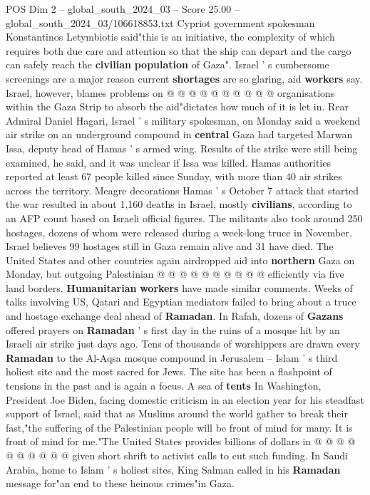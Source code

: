 \begin{textsample}{POS Dim 2 – global\_south\_2024\_03 – Score 25.00 – global\_south\_2024\_03/106618853.txt}
Cypriot government spokesman Konstantinos Letymbiotis said"this is an initiative, the complexity of which requires both due care and attention so that the ship can depart and the cargo can safely reach the \textbf{civilian} \textbf{population} of Gaza".
Israel ' s cumbersome screenings are a major reason current \textbf{shortages} are so glaring, aid \textbf{workers} say.
Israel, however, blames problems on @ @ @ @ @ @ @ @ @ @ organisations within the Gaza Strip to absorb the aid"dictates how much of it is let in.
Rear Admiral Daniel Hagari, Israel ' s military spokesman, on Monday said a weekend air strike on an underground compound in \textbf{central} Gaza had targeted Marwan Issa, deputy head of Hamas ' s armed wing.
Results of the strike were still being examined, he said, and it was unclear if Issa was killed.
Hamas authorities reported at least 67 people killed since Sunday, with more than 40 air strikes across the territory.
Meagre decorations Hamas ' s October 7 attack that started the war resulted in about 1,160 deaths in Israel, mostly \textbf{civilians}, according to an AFP count based on Israeli official figures.
The militants also took around 250 hostages, dozens of whom were released during a week-long truce in November.
Israel believes 99 hostages still in Gaza remain alive and 31 have died.
The United States and other countries again airdropped aid into \textbf{northern} Gaza on Monday, but outgoing Palestinian @ @ @ @ @ @ @ @ @ @ efficiently via five land borders. \textbf{Humanitarian} \textbf{workers} have made similar comments.
Weeks of talks involving US, Qatari and Egyptian mediators failed to bring about a truce and hostage exchange deal ahead of \textbf{Ramadan}.
In Rafah, dozens of \textbf{Gazans} offered prayers on \textbf{Ramadan} ' s first day in the ruins of a mosque hit by an Israeli air strike just days ago.
Tens of thousands of worshippers are drawn every \textbf{Ramadan} to the Al-Aqsa mosque compound in Jerusalem -- Islam ' s third holiest site and the most sacred for Jews.
The site has been a flashpoint of tensions in the past and is again a focus.
A sea of \textbf{tents} In Washington, President Joe Biden, facing domestic criticism in an election year for his steadfast support of Israel, said that as Muslims around the world gather to break their fast,"the suffering of the Palestinian people will be front of mind for many.
It is front of mind for me."The United States provides billions of dollars in @ @ @ @ @ @ @ @ @ @ given short shrift to activist calls to cut such funding.
In Saudi Arabia, home to Islam ' s holiest sites, King Salman called in his \textbf{Ramadan} message for"an end to these heinous crimes"in Gaza.

\end{textsample}
